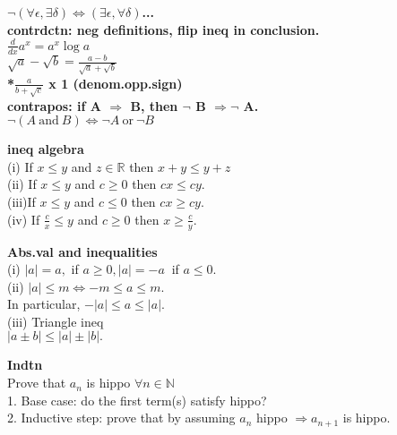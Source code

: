 \documentclass[10pt,landscape,a4paper]{article}
\def\line{

  \noindent{\color{mygray} \rule{\linewidth}{0.005mm}}

}
\def\R{\mathbb{R}}
\def\N{\mathbb{N}}
\newcommand\hint[1]{\textcolor{trolleygrey}{\bf#1}}
\newcommand\greenbox[1]{\line\textcolor{ferngreen}{\bf#1}}
\begin{document}
\begin{multicols}{8}

\setlength{\premulticols}{0.1pt}
\setlength{\postmulticols}{0.1pt}
\setlength{\multicolsep}{0.1pt}
\setlength{\columnsep}{0.1pt}
\setlength{\abovedisplayskip}{1pt}
\setlength{\belowdisplayskip}{1pt}
\setlength{\abovedisplayshortskip}{1pt}
\setlength{\belowdisplayshortskip}{1pt}
\setlength{\parindent}{0pt}
\setlength{\parskip}{0pt plus 0.3ex}


\tiny
\hint{$\neg (\forall \epsilon, \exists \delta) \Leftrightarrow (\exists \epsilon, \forall \delta)$...\\ contrdctn: neg definitions, flip ineq in conclusion.}\\
\hint{$\frac{d}{dx} a^x = a^x \log a$}\\
\hint{*$\surd{a} - \surd{b} = \frac{a - b}{\surd{a} + \surd{b}}$\\ *$\frac{a}{b +\surd{c}}$ x 1 (denom.opp.sign)}\\
\hint{* contrapos: if A $\Rightarrow$ B, then $\neg$ B $\Rightarrow \neg$ A.}\\
$\neg (A\ \mathrm{and} \ B) \Leftrightarrow \neg A\ \mathrm{or}\ \neg B$
\greenbox{ineq algebra}\\ (i) If $x \leq y$ and $z \in \R$ then $x + y \leq y + z$\\ 
(ii) If $x \leq y$ and $c \geq 0$ then $cx \leq cy.$\\
(iii)If $x \leq y$ and $c \leq 0$ then $cx \geq cy.$\\
(iv) If $\frac{c}{x} \leq y$ and $c\geq 0$ then $x \geq \frac{c}{y}$. 

\greenbox{Abs.val and inequalities}\\
(i) $|a| = a,$  if $a \geq  0, |a| = - a\ $ if $a \leq 0.$\\
(ii) $|a| \leq m \Leftrightarrow - m \leq a \leq m.$ \\ In particular, $-|a| \leq a \leq |a|$.\\
(iii) \textcolor{ferngreen}{Triangle ineq}\\ $|a \pm b| \leq |a| \pm |b|.$
\greenbox{Indtn}\\Prove that $a_n$ is hippo $\forall n \in \N$
\\1. Base case: do the first term(s) satisfy hippo?
\\2. Inductive step: prove that by assuming $a_n$ hippo $\Rightarrow a_{n+1}$ is hippo.


\end{multicols}
\end{document}
